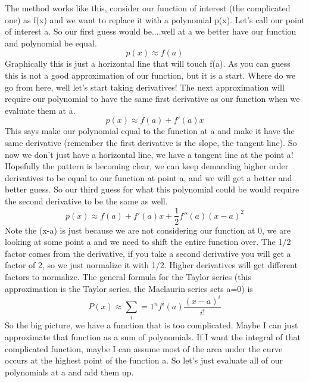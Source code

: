 \documentclass{article}
\begin{document}
The method works like this, consider our function of interest (the complicated one) as f(x) and we want to replace it with a polynomial p(x). 
Let's call our point of interest a. 
So our first guess would be....well at a we better have our function and polynomial be equal.
\begin{equation}
    p(x) \approx f(a)
\end{equation}
Graphically this is just a horizontal line that will touch f(a). 
As you can guess this is not a good approximation of our function, but it is a start. 
Where do we go from here, well let's start taking derivatives!
The next approximation will require our polynomial to have the same first derivative as our function when we evaluate them at a. 
\begin{equation}
    p(x) \approx f(a) + f'(a)x
\end{equation}
This says make our polynomial equal to the function at a and make it have the same derivative (remember the first derivative is the slope, the tangent line). 
So now we don't just have a horizontal line, we have a tangent line at the point a!
Hopefully the pattern is becoming clear, we can keep demanding higher order derivatives to be equal to our function at point a, and we will get a better and better guess. 
So our third guess for what this polynomial could be would require the second derivative to be the same as well. 
\begin{equation}
    p(x) \approx f(a) + f'(a)x + \frac{1}{2}f''(a)(x-a)^2
\end{equation}
Note the (x-a) is just because we are not considering our function at 0, we are looking at some point a and we need to shift the entire function over. 
The 1/2 factor comes from the derivative, if you take a second derivative you will get a factor of 2, so we just normalize it with 1/2. 
Higher derivatives will get different factors to normalize. 
The general formula for the Taylor series (this approximation is the Taylor series, the Maclaurin series sets a=0) is 
\begin{equation}
    P(x) \approx \sum_i=1^n f^i(a) \frac{(x-a)^i}{i!}
\end{equation}
So the big picture, we have a function that is too complicated. 
Maybe I can just approximate that function as a sum of polynomials. 
If I want the integral of that complicated function, maybe I can assume most of the area under the curve occurs at the highest point of the function a. 
So let's just evaluate all of our polynomials at a and add them up. 
\end{document}
